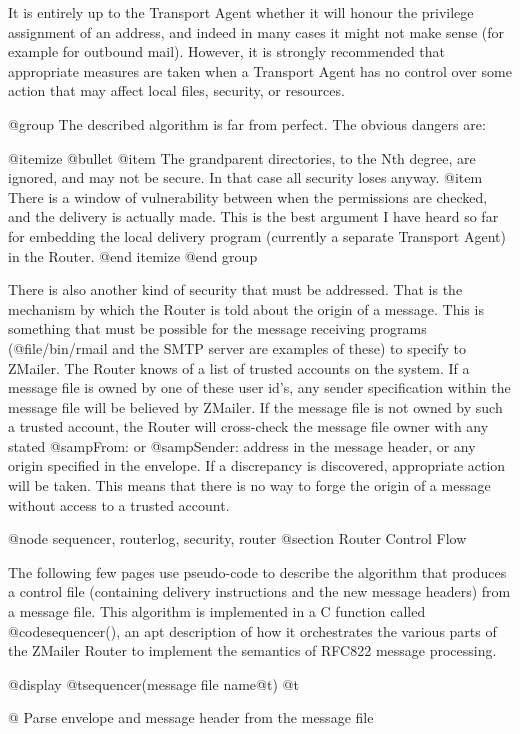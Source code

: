 {{It is entirely up to the Transport Agent whether it will honour
the privilege assignment of an address, and indeed in many cases
it might not make sense (for example for outbound mail).
However, it is strongly recommended that appropriate measures are
taken when a Transport Agent has no control over some action that
may affect local files, security, or resources.

@group
The described algorithm is far from perfect.  The obvious dangers are:

@itemize @bullet
@item
The grandparent directories, to the Nth degree, are ignored, and
may not be secure. In that case all security loses anyway.
@item
There is a window of vulnerability between when the permissions
are checked, and the delivery is actually made. This is the
best argument I have heard so far for embedding the local delivery
program (currently a separate Transport Agent) in the Router.
@end itemize
@end group

There is also another kind of security that must be addressed.
That is the mechanism by which the Router is told about the origin
of a message.
This is something that must be possible for the message receiving
programs (@file{/bin/rmail} and the SMTP server are examples of these)
to specify to ZMailer.
The Router knows of a list of trusted accounts on the system.
If a message file is owned by one of these user id's, any sender
specification within the message file will be believed by ZMailer.
If the message file is not owned by such a trusted account, the Router
will cross-check the message file owner with any stated @samp{From:}
or @samp{Sender:} address in the message header, or any origin specified
in the envelope.
If a discrepancy is discovered, appropriate action will be taken.
This means that there is no way to forge the origin of a message
without access to a trusted account.

@node sequencer, routerlog, security, router
@section Router Control Flow

The following few pages use pseudo-code to describe the algorithm that
produces a control file (containing delivery instructions and the new
message headers) from a message file.
This algorithm is implemented in a C function called @code{sequencer()},
an apt description of how it orchestrates the various parts of
the ZMailer Router to implement the semantics of RFC822 message processing.

@display
@t{sequencer(}message file name@t{)}
@t{@{}
    Parse envelope and message header from the message file

}}}
